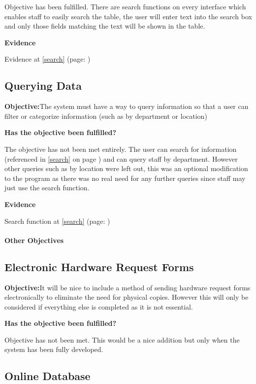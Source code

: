 Objective has been fulfilled. There are search functions on every interface which enables staff to easily search the table, the user will enter text into the search box and only those fields matching the text will be shown in the table.

\textbf{Evidence}

Evidence at \ref{search} (page: \pageref{search})


\subsection{Querying Data}

\textbf{Objective:}The system must have a way to query information so that a user can filter or categorize information (such as by department or location)

\textbf{Has the objective been fulfilled?}

The objective has not been met entirely. The user can search for information (referenced in \ref{search} on page \pageref{search}) and can query staff by department. However other queries such as by location were left out, this was an optional modification to the program as there was no real need for any further queries since staff may just use the search function.

\textbf{Evidence}

Search function at \ref{search}  (page: \pageref{search})


\paragraph{Other Objectives}

\subsection{Electronic Hardware Request Forms}

\textbf{Objective:}It will be nice to include a method of sending hardware request forms electronically to eliminate the need for physical copies. However this will only be considered if everything else is completed as it is not essential.

\textbf{Has the objective been fulfilled?}

Objective has not been met. This would be a nice addition but only when the system has been fully developed.



\subsection{Online Database}

